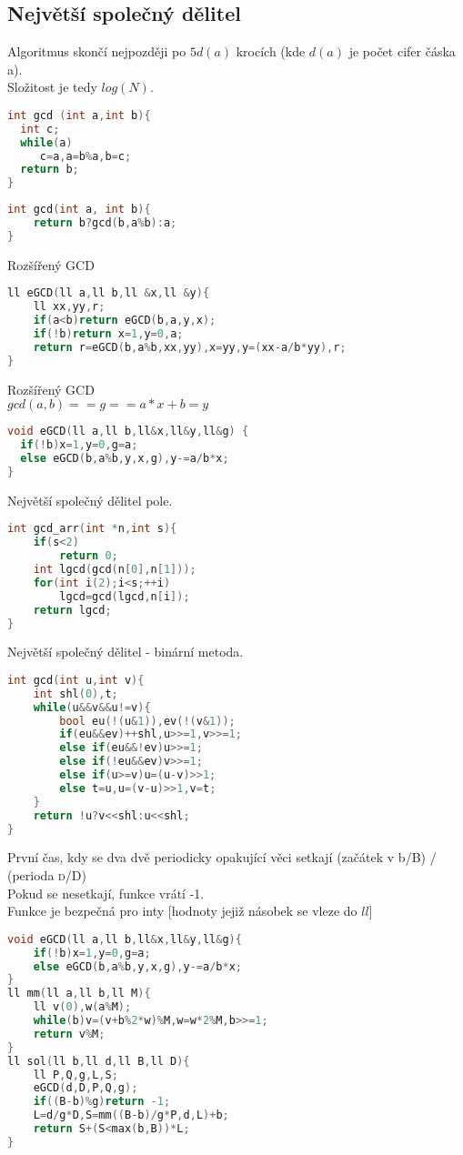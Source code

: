 \documentclass[11pt]{article}
\begin{document}
\subsection{Největší společný dělitel}
Algoritmus skončí nejpozději po $5d(a)$ krocích (kde $d(a)$ je počet cifer čáska \textsf{a}).
\\Složitost je tedy $log(N)$.
\begin{lstlisting}[language=C++]
int gcd (int a,int b){
  int c;
  while(a)
     c=a,a=b%a,b=c;
  return b;
}
\end{lstlisting}
\begin{lstlisting}[language=C++]
int gcd(int a, int b){  
    return b?gcd(b,a%b):a;    
}
\end{lstlisting}
\begin{center}
Rozšířený \textsf{GCD}
\end{center}
\begin{lstlisting}[language=C++]
ll eGCD(ll a,ll b,ll &x,ll &y){
    ll xx,yy,r;
    if(a<b)return eGCD(b,a,y,x);
    if(!b)return x=1,y=0,a;
    return r=eGCD(b,a%b,xx,yy),x=yy,y=(xx-a/b*yy),r;
}
\end{lstlisting}
Rozšířený \textsf{GCD}
\\$gcd(a,b)==g==a*x+b=y$
\begin{lstlisting}[language=C++]
void eGCD(ll a,ll b,ll&x,ll&y,ll&g) {
  if(!b)x=1,y=0,g=a;
  else eGCD(b,a%b,y,x,g),y-=a/b*x;
}
\end{lstlisting}
\begin{center}
Největší společný dělitel pole.
\end{center}
\begin{lstlisting}[language=C++]
int gcd_arr(int *n,int s){
    if(s<2)
        return 0;
    int lgcd(gcd(n[0],n[1]));
    for(int i(2);i<s;++i)
        lgcd=gcd(lgcd,n[i]);
    return lgcd;
}
\end{lstlisting}
\begin{center}
Největší společný dělitel - binární metoda.
\end{center}
\begin{lstlisting}[language=C++]
int gcd(int u,int v){
    int shl(0),t;
    while(u&&v&&u!=v){
        bool eu(!(u&1)),ev(!(v&1));
        if(eu&&ev)++shl,u>>=1,v>>=1;
        else if(eu&&!ev)u>>=1;
        else if(!eu&&ev)v>>=1;
        else if(u>=v)u=(u-v)>>1;
        else t=u,u=(v-u)>>1,v=t;
    }
    return !u?v<<shl:u<<shl;
}
\end{lstlisting}
První čas, kdy se dva dvě periodicky opakující věci setkají (začátek v \textsf{b}/\textsf{B}) / (perioda \textsc{d}/\textsf{D})
\\Pokud se nesetkají, funkce vrátí -1.
\\Funkce je bezpečná pro inty [hodnoty jejiž násobek se vleze do $ll$]
\begin{lstlisting}[language=C++]
void eGCD(ll a,ll b,ll&x,ll&y,ll&g){
    if(!b)x=1,y=0,g=a;
    else eGCD(b,a%b,y,x,g),y-=a/b*x;
}
ll mm(ll a,ll b,ll M){
    ll v(0),w(a%M);
    while(b)v=(v+b%2*w)%M,w=w*2%M,b>>=1;
    return v%M;
}
ll sol(ll b,ll d,ll B,ll D){
    ll P,Q,g,L,S;
    eGCD(d,D,P,Q,g);
    if((B-b)%g)return -1;
    L=d/g*D,S=mm((B-b)/g*P,d,L)+b;
    return S+(S<max(b,B))*L;
}
\end{lstlisting}
\end{document}
